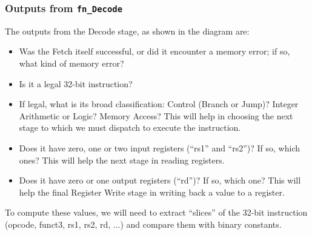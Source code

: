 \begin{frame}
\frametitle{Outputs from {\tt fn\_Decode}}

\footnotesize

The outputs from the Decode stage, as shown in the diagram are:

\PAUSE{\vspace{1ex}}

\begin{itemize}

 \item Was the Fetch itself successful, or did it encounter a memory
   error; if so, what kind of memory error?

 \PAUSE{\vspace{1ex}}

 \item Is it a legal 32-bit instruction?

 \PAUSE{\vspace{1ex}}

 \item If legal, what is its broad classification: Control (Branch or
   Jump)? Integer Arithmetic or Logic? Memory Access?  This will help
   in choosing the next stage to which we must dispatch to execute the
   instruction.

 \PAUSE{\vspace{1ex}}

 \item Does it have zero, one or two input registers (``rs1'' and
   ``rs2'')?  If so, which ones?  This will help the next stage in
   reading registers.

 \PAUSE{\vspace{1ex}}

 \item Does it have zero or one output registers (``rd'')?  If so,
   which one?  This will help the final Register Write stage in
   writing back a value to a register.

\end{itemize}

\PAUSE{\vspace{2ex}}

To compute these values, we will need to extract ``slices'' of the
32-bit instruction (opcode, funct3, rs1, rs2, rd, ...) and compare
them with binary constants.

\end{frame}


